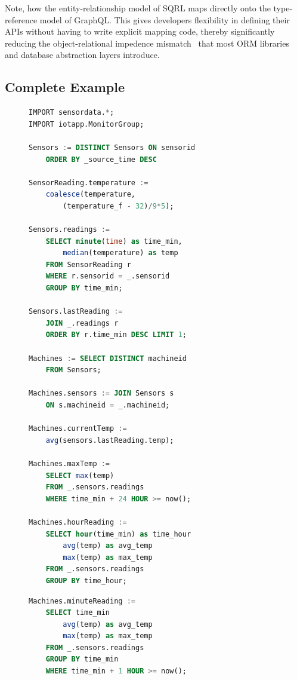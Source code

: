 \documentclass[	DIV=calc,%
							paper=letter,%
							fontsize=11pt,%
							twocolumn]{scrartcl}	 					%
\begin{document}
Note, how the entity-relationship model of SQRL maps directly onto the type-reference model of GraphQL. This gives developers flexibility in defining their APIs without having to write explicit mapping code, thereby significantly reducing the object-relational impedence mismatch~\cite{} that most ORM libraries and database abstraction layers introduce.

\subsection{Complete Example}

\begin{figure}[!ht]
    \begin{minipage}[l]{1.0\columnwidth}
        \centering
        \begin{lstlisting}[language=SQL]
IMPORT sensordata.*;
IMPORT iotapp.MonitorGroup;

Sensors := DISTINCT Sensors ON sensorid
    ORDER BY _source_time DESC

SensorReading.temperature :=
    coalesce(temperature,
        (temperature_f - 32)/9*5);

Sensors.readings :=
    SELECT minute(time) as time_min,
        median(temperature) as temp
    FROM SensorReading r
    WHERE r.sensorid = _.sensorid
    GROUP BY time_min;

Sensors.lastReading :=
    JOIN _.readings r
    ORDER BY r.time_min DESC LIMIT 1;

Machines := SELECT DISTINCT machineid
    FROM Sensors;

Machines.sensors := JOIN Sensors s
    ON s.machineid = _.machineid;

Machines.currentTemp :=
    avg(sensors.lastReading.temp);

Machines.maxTemp :=
    SELECT max(temp)
    FROM _.sensors.readings
    WHERE time_min + 24 HOUR >= now();

Machines.hourReading :=
    SELECT hour(time_min) as time_hour
        avg(temp) as avg_temp
        max(temp) as max_temp
    FROM _.sensors.readings
    GROUP BY time_hour;
    \end{lstlisting}
    \end{minipage}
    \hfill{}
    \begin{minipage}[r][][b]{1.0\columnwidth}
    \centering
    \begin{lstlisting}[language=SQL]
Machines.minuteReading :=
    SELECT time_min
        avg(temp) as avg_temp
        max(temp) as max_temp
    FROM _.sensors.readings
    GROUP BY time_min
    WHERE time_min + 1 HOUR >= now();


\end{lstlisting}
\end{minipage}
\end{figure}
\end{document}

